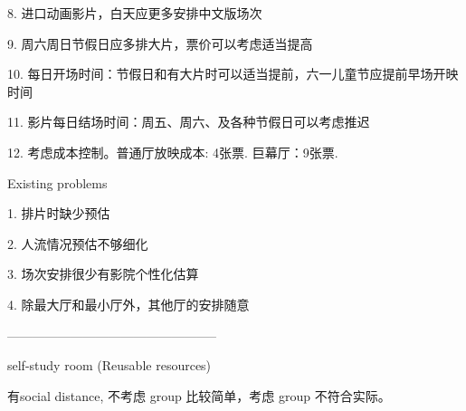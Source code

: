 8. 进口动画影片，白天应更多安排中文版场次

9. 周六周日节假日应多排大片，票价可以考虑适当提高

10. 每日开场时间：节假日和有大片时可以适当提前，六一儿童节应提前早场开映时间

11. 影片每日结场时间：周五、周六、及各种节假日可以考虑推迟

12. 考虑成本控制。普通厅放映成本: 4张票. 巨幕厅：9张票.

Existing problems

1. 排片时缺少预估

2. 人流情况预估不够细化

3. 场次安排很少有影院个性化估算

4. 除最大厅和最小厅外，其他厅的安排随意


--------------------------------------------------

self-study room (Reusable resources)

有social distance, 不考虑 group 比较简单，考虑 group 不符合实际。 